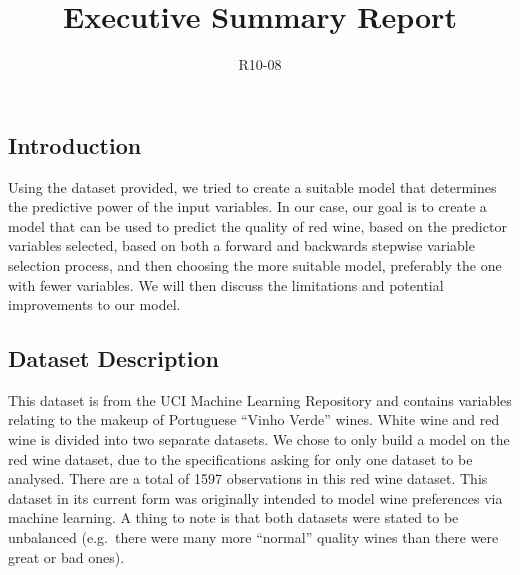 \documentclass[a4paper,9pt,twocolumn,twoside,]{pinp}
\title{Executive Summary Report}
\author[]{R10-08}
\begin{document}
\verticaladjustment{-2pt}

\maketitle
\thispagestyle{firststyle}



\hypertarget{introduction}{%
\subsection{Introduction}\label{introduction}}

Using the dataset provided, we tried to create a suitable model that
determines the predictive power of the input variables. In our case, our
goal is to create a model that can be used to predict the quality of red
wine, based on the predictor variables selected, based on both a forward
and backwards stepwise variable selection process, and then choosing the
more suitable model, preferably the one with fewer variables. We will
then discuss the limitations and potential improvements to our model.

\hypertarget{dataset-description}{%
\subsection{Dataset Description}\label{dataset-description}}

This dataset is from the UCI Machine Learning Repository and contains
variables relating to the makeup of Portuguese ``Vinho Verde'' wines.
White wine and red wine is divided into two separate datasets. We chose
to only build a model on the red wine dataset, due to the specifications
asking for only one dataset to be analysed. There are a total of 1597
observations in this red wine dataset. This dataset in its current form
was originally intended to model wine preferences via machine learning.
A thing to note is that both datasets were stated to be unbalanced
(e.g.~there were many more ``normal'' quality wines than there were
great or bad ones).
\end{document}
